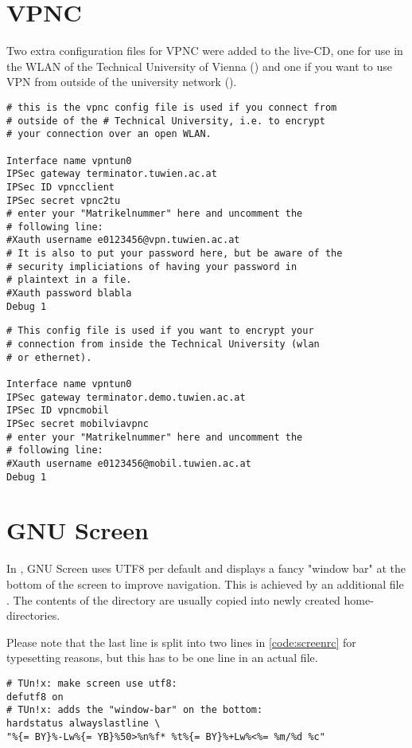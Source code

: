 \section{VPNC}
Two extra configuration files for VPNC were added to the live-CD, one for use
in the WLAN of the Technical University of Vienna ()
and one if you want to use VPN from outside of the university network
().
\begin{lstlisting}[float=ht,label=code:vpnc.conf,caption=VPNC config-file for
use from outside the University]
# this is the vpnc config file is used if you connect from
# outside of the # Technical University, i.e. to encrypt
# your connection over an open WLAN.

Interface name vpntun0
IPSec gateway terminator.tuwien.ac.at
IPSec ID vpncclient
IPSec secret vpnc2tu
# enter your "Matrikelnummer" here and uncomment the
# following line:
#Xauth username e0123456@vpn.tuwien.ac.at
# It is also to put your password here, but be aware of the
# security impliciations of having your password in
# plaintext in a file.
#Xauth password blabla
Debug 1
\end{lstlisting}

\begin{lstlisting}[float=ht,label=code:vpnc.wlan.conf,caption=VPNC config-file for
use in the TU of Vienna WLAN]
# This config file is used if you want to encrypt your
# connection from inside the Technical University (wlan
# or ethernet).

Interface name vpntun0
IPSec gateway terminator.demo.tuwien.ac.at
IPSec ID vpncmobil
IPSec secret mobilviavpnc
# enter your "Matrikelnummer" here and uncomment the
# following line:
#Xauth username e0123456@mobil.tuwien.ac.at
Debug 1
\end{lstlisting}

\section{GNU Screen}
In \tunix, GNU Screen uses UTF8 per default and displays a fancy "window bar" at
the bottom of the screen to improve navigation. This is achieved by an
additional file . The contents of the 
directory are usually copied into newly created home-directories.

Please note that the last line is split into two lines in \lstlistingname{}
\ref{code:screenrc} for typesetting reasons, but this has to be one line in an
actual file.
\begin{lstlisting}[float=ht,label=code:screenrc,caption=Additional configuration
for GNU Screen]
# TUn!x: make screen use utf8:
defutf8 on
# TUn!x: adds the "window-bar" on the bottom:
hardstatus alwayslastline \
"%{= BY}%-Lw%{= YB}%50>%n%f* %t%{= BY}%+Lw%<%= %m/%d %c"
\end{lstlisting}

